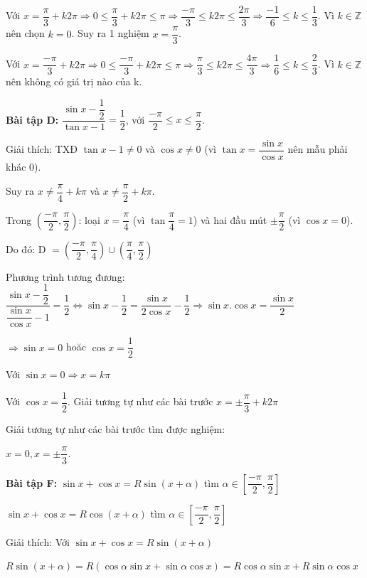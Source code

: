 \documentclass[12pt,a4paper]{article}
\begin{document}
Với $x = \dfrac{\pi}{3} + k2\pi \Rightarrow 0 \le \dfrac{\pi}{3} + k2\pi \le \pi \Rightarrow \dfrac{-\pi}{3} \le k2\pi \le \dfrac{2\pi}{3} \Rightarrow \dfrac{-1}{6} \le k \le \dfrac{1}{3}$. Vì $k \in \mathbb{Z}$ nên chọn $k = 0$. Suy ra 1 nghiệm $x = \dfrac{\pi}{3}$.

Với $x = \dfrac{-\pi}{3} + k2\pi \Rightarrow 0 \le \dfrac{-\pi}{3} + k2\pi \le \pi \Rightarrow \dfrac{\pi}{3} \le k2\pi \le \dfrac{4\pi}{3} \Rightarrow \dfrac{1}{6} \le k \le \dfrac{2}{3}$. Vì $k \in \mathbb{Z}$ nên không có giá trị nào của k.

\textbf{Bài tập D:} $\dfrac{\sin x - \dfrac{1}{2}}{\tan x - 1} = \dfrac{1}{2}$, với $\dfrac{-\pi}{2} \le x \le \dfrac{\pi}{2}$.

Giải thích: TXĐ $\tan x - 1 \ne 0$ và $\cos x \ne 0$ (vì $\tan x = \dfrac{\sin x}{\cos x}$ nên mẫu phải khác $0$).

Suy ra $x \ne \dfrac{\pi}{4} + k\pi$ và $x \ne \dfrac{\pi}{2} + k\pi$.

Trong $(\dfrac{-\pi}{2}, \dfrac{\pi}{2})$: loại $x = \dfrac{\pi}{4}$ (vì $\tan \dfrac{\pi}{4} = 1$) và hai đầu mút $\pm\dfrac{\pi}{2}$ (vì $\cos x = 0$).

Do đó: D $=(\dfrac{-\pi}{2}, \dfrac{\pi}{4}) \cup (\dfrac{\pi}{4}, \dfrac{\pi}{2})$

Phương trình tương đương: $\dfrac{\sin x - \dfrac{1}{2}}{\dfrac{\sin x}{\cos x} - 1} = \dfrac{1}{2} \Leftrightarrow \sin x - \dfrac{1}{2} = \dfrac{\sin x}{2\cos x} - \dfrac{1}{2} \Rightarrow \sin x . \cos x = \dfrac{\sin x}{2}$

$\Rightarrow \sin x = 0$ hoăc $\cos x = \dfrac{1}{2}$

Với $\sin x = 0 \Rightarrow x = k\pi$

Với $\cos x = \dfrac{1}{2}$. Giải tương tự như các bài trước $x = \pm \dfrac{\pi}{3} + k2\pi$

Giải tương tự như các bài trước tìm được nghiệm:

$x = 0, x = \pm\dfrac{\pi}{3}$.

\textbf{Bài tập F:} $\sin x + \cos x = R \sin (x + \alpha)$ tìm $\alpha \in [\dfrac{-\pi}{2}, \dfrac{\pi}{2}]$

 $\sin x + \cos x = R \cos (x + \alpha)$ tìm $\alpha \in [\dfrac{-\pi}{2}, \dfrac{\pi}{2}]$

 Giải thích: Với $\sin x + \cos x = R \sin (x + \alpha)$
 
 $R\sin(x + \alpha) = R(\cos \alpha \sin x + \sin\alpha \cos x) = R\cos \alpha \sin x + R\sin\alpha \cos x$
\end{document}
